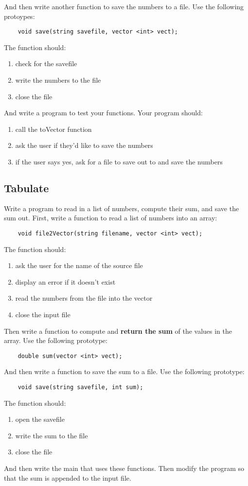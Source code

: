 \documentclass{article}
\begin{document}
 And then write another function to save the numbers to a file. Use the following protoypes:
\begin{verbatim}
	void save(string savefile, vector <int> vect);
\end{verbatim}
The function should:
\begin{enumerate}
	\item check for the savefile
	\item write the numbers to the file
	\item close the file
\end{enumerate}
And write a program to test your functions. Your program should:
\begin{enumerate}
	\item call the toVector function
	\item ask the user if they'd like to save the numbers
	\item if the user says yes, ask for a file to save out to and save the numbers
\end{enumerate}

\subsection{Tabulate}
Write a program to read in a list of numbers, compute their sum, and save the sum out. First, write a function to read a list of numbers into an array:
\begin{verbatim}
	void file2Vector(string filename, vector <int> vect);
\end{verbatim}
The function should:
\begin{enumerate}
	\item ask the user for the name of the source file
	\item display an error if it doesn't exist
	\item read the numbers from the file into the vector
	\item close the input file
\end{enumerate}
Then write a function to compute and \textbf{return the sum} of the values in the array. Use the following prototype:
\begin{lstlisting}
	double sum(vector <int> vect);
\end{lstlisting}
And then write a function to save the sum to a file. Use the following prototype:
\begin{verbatim}
	void save(string savefile, int sum);
\end{verbatim}
The function should:
\begin{enumerate}
	\item open the savefile
	\item write the sum to the file
	\item close the file
\end{enumerate}
And then write the main that uses these functions. Then modify the program so that the sum is appended to the input file.
\end{document}
